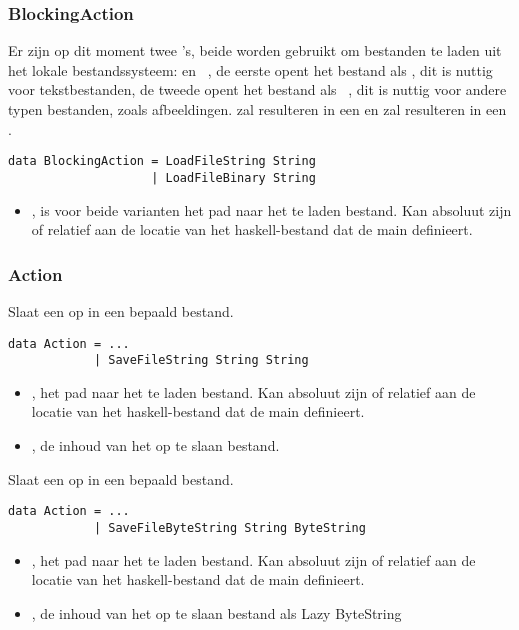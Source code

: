 \subsubsection{BlockingAction}
Er zijn op dit moment twee 's, beide worden gebruikt om bestanden te laden uit het lokale bestandssysteem:  en ~, de eerste opent het bestand als , dit is nuttig voor tekstbestanden, de tweede opent het bestand als ~, dit is nuttig voor andere typen bestanden, zoals afbeeldingen.  zal resulteren in een  en  zal resulteren in een .
\begin{lstlisting}
data BlockingAction = LoadFileString String
					| LoadFileBinary String
\end{lstlisting}
\begin{itemize}
	\item {}, is voor beide varianten het pad naar het te laden bestand. Kan absoluut zijn of relatief aan de locatie van het haskell-bestand dat de main definieert.
\end{itemize}

\subsubsection{Action}
Slaat een  op in een bepaald bestand.
\begin{lstlisting}
data Action = ...
			| SaveFileString String String
\end{lstlisting}
\begin{itemize}
	\item {}, het pad naar het te laden bestand. Kan absoluut zijn of relatief aan de locatie van het haskell-bestand dat de main definieert.
	\item {}, de inhoud van het op te slaan bestand.
\end{itemize}

Slaat een  op in een bepaald bestand.
\begin{lstlisting}
data Action = ...
			| SaveFileByteString String ByteString
\end{lstlisting}
\begin{itemize}
	\item {}, het pad naar het te laden bestand. Kan absoluut zijn of relatief aan de locatie van het haskell-bestand dat de main definieert.
	\item {}, de inhoud van het op te slaan bestand als Lazy ByteString
\end{itemize}


